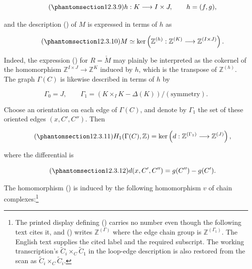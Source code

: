 \begin{equation}\tag{\SGARefTarget{sga7.sga7i.eix.n12-3-9}{12.3.9}}
 h:K\longrightarrow I\times J,
 \qquad h=(f,g),
\end{equation}

\noindent
and the description () of $M$ is expressed in terms of $h$ as

\begin{equation}\tag{\SGARefTarget{sga7.sga7i.eix.n12-3-10}{12.3.10}}
 M\simeq\ker\left(
  \mathbb Z^{(h)}:\mathbb Z^{(K)}\longrightarrow
  \mathbb Z^{(I\times J)}\right).
\end{equation}

Indeed, the expression () for $R=\check M$ may plainly be
interpreted as the cokernel of the homomorphism
$\mathbb Z^{I\times J}\to\mathbb Z^K$ induced by $h$, which is the
transpose of $\mathbb Z^{(h)}$. The graph $\Gamma(C)$ is likewise described
in terms of $h$ by

\begin{equation*}
 \Gamma_0=J,
 \qquad
 \Gamma_1=(K\times_I K-\Delta(K))/(\text{symmetry}).
\end{equation*}

Choose an orientation on each edge of $\Gamma(C)$, and denote by
$\Gamma_1$ the set of these oriented edges $(x,C',C'')$. Then

\begin{equation}\tag{\SGARefTarget{sga7.sga7i.eix.n12-3-11}{12.3.11}}
 H_1(\Gamma(C),\mathbb Z)=
 \ker\left(d:\mathbb Z^{(\Gamma_1)}\longrightarrow\mathbb Z^{(J)}\right),
\end{equation}

\noindent
where the differential is

\begin{equation}\tag{\SGARefTarget{sga7.sga7i.eix.n12-3-12}{12.3.12}}
 d(x,C',C'')=g(C'')-g(C').
\end{equation}

The homomorphism () is induced by the following homomorphism $v$ of
chain complexes:\footnote{The printed display defining () carries
no number even though the following text cites it, and () writes
$\mathbb Z^{(\Gamma)}$ where the edge chain group is
$\mathbb Z^{(\Gamma_1)}$. The English text supplies the cited label and
the required subscript. The working transcription's
$\widetilde C_i\times_C\widetilde C_1$ in the loop-edge description is
also restored from the scan as
$\widetilde C_i\times_C\widetilde C_i$.}

